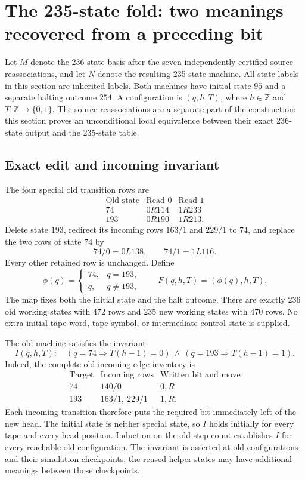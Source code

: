 \section{The 235-state fold: two meanings recovered from a preceding bit}
\label{sec:fold235}

Let $M$ denote the 236-state basis after the seven independently certified
source reassociations, and let $N$ denote the resulting 235-state machine.
All state labels in this section are inherited labels.  Both machines have
initial state $95$ and a separate halting outcome $254$.  A configuration is
$(q,h,T)$, where $h\in\mathbb Z$ and $T:\mathbb Z\to\{0,1\}$.
The source reassociations are a separate part of the construction: this
section proves an unconditional local equivalence between their exact
236-state output and the 235-state table.

\subsection{Exact edit and incoming invariant}

The four special old transition rows are
\[
\begin{array}{c|cc}
\text{Old state}&\text{Read }0&\text{Read }1\\\hline
74&0R114&1R233\\
193&0R190&1R213.
\end{array}
\]
Delete state $193$, redirect its incoming rows $163/1$ and $229/1$ to $74$,
and replace the two rows of state $74$ by
\[
74/0=0L138,\qquad 74/1=1L116.
\]
Every other retained row is unchanged.  Define
\[
\phi(q)=\begin{cases}74,&q=193,\\q,&q\ne193,\end{cases}
\qquad
F(q,h,T)=(\phi(q),h,T).
\]
The map fixes both the initial state and the halt outcome.  There are exactly
$236$ old working states with $472$ rows and $235$ new working states with
$470$ rows.  No extra initial tape word, tape symbol, or intermediate control
state is supplied.

The old machine satisfies the invariant
\[
I(q,h,T):\quad
(q=74\Longrightarrow T(h-1)=0)\ \land\
(q=193\Longrightarrow T(h-1)=1).
\]
Indeed, the complete old incoming-edge inventory is
\[
\begin{array}{c|c|c}
\text{Target}&\text{Incoming rows}&\text{Written bit and move}\\\hline
74&140/0&0,R\\
193&163/1,\ 229/1&1,R.
\end{array}
\]
Each incoming transition therefore puts the required bit immediately left
of the new head.  The initial state is neither special state, so $I$ holds
initially for every tape and every head position.  Induction on the old
step count establishes $I$ for every reachable old configuration.  The
invariant is asserted at old configurations and their simulation
checkpoints; the reused helper states may have additional meanings between
those checkpoints.

